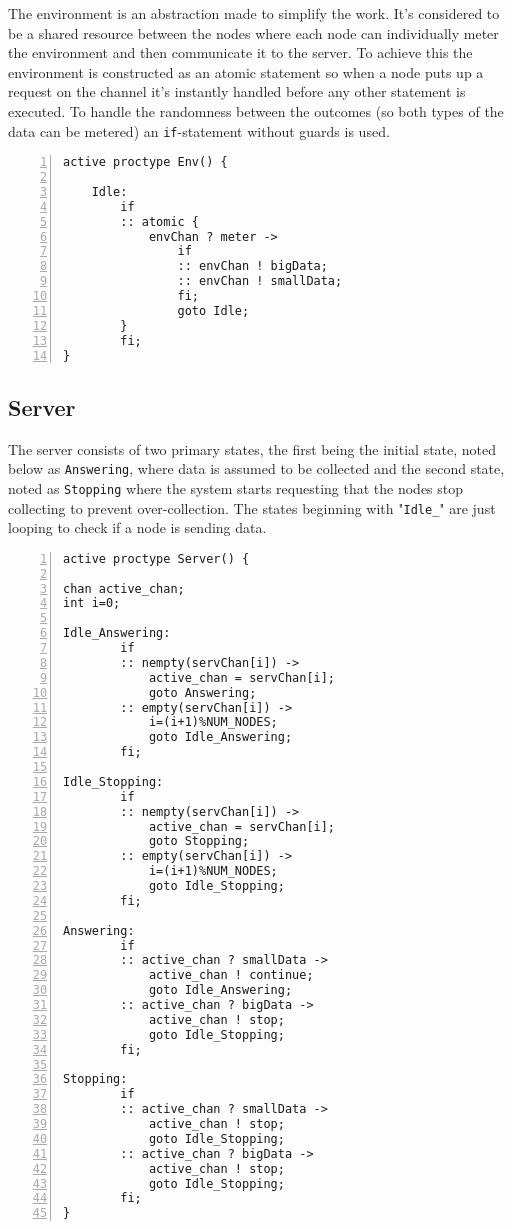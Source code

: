 The environment is an abstraction made to simplify the work. It's considered to be a shared resource between the nodes where each node can individually meter the environment and then communicate it to the server. To achieve this the environment is constructed as an atomic statement so when a node puts up a request on the channel it's instantly handled before any other statement is executed. To handle the randomness between the outcomes (so both types of the data can be metered) an \texttt{if}-statement without guards is used. 

\begin{lstlisting}[caption=Environment code,language=Promela, numbers=left, basicstyle=\footnotesize, tabsize=2]
active proctype Env() {

	Idle:  
		if
		:: atomic { 
			envChan ? meter ->  
				if
				:: envChan ! bigData;
				:: envChan ! smallData;
				fi; 
				goto Idle;
		}
		fi;
}
\end{lstlisting}

\subsection{Server}

The server consists of two primary states, the first being the initial state, noted below as \texttt{Answering}, where data is assumed to be collected and the second state, noted as \texttt{Stopping} where the system starts requesting that the nodes stop collecting to prevent over-collection. The states beginning with "\texttt{Idle\_}" are just looping to check if a node is sending data.

\begin{lstlisting}[caption={Server code},language=Promela, numbers=left, basicstyle=\footnotesize, tabsize=2]
active proctype Server() {
   
chan active_chan;
int i=0;

Idle_Answering: 
        if
        :: nempty(servChan[i]) -> 
            active_chan = servChan[i];
            goto Answering; 
        :: empty(servChan[i]) ->
            i=(i+1)%NUM_NODES;
            goto Idle_Answering;
        fi;

Idle_Stopping:
        if
        :: nempty(servChan[i]) -> 
            active_chan = servChan[i]; 
            goto Stopping; 
        :: empty(servChan[i]) ->
            i=(i+1)%NUM_NODES;
            goto Idle_Stopping;
        fi;

Answering: 
        if
        :: active_chan ? smallData -> 
            active_chan ! continue; 
            goto Idle_Answering;
        :: active_chan ? bigData ->
            active_chan ! stop;
            goto Idle_Stopping;
        fi;

Stopping:    
        if
        :: active_chan ? smallData -> 
            active_chan ! stop; 
            goto Idle_Stopping;
        :: active_chan ? bigData ->
            active_chan ! stop;
            goto Idle_Stopping;
        fi;
}
\end{lstlisting}

